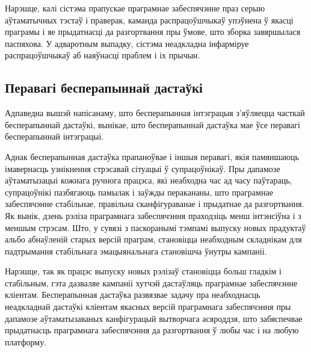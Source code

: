 Нарэшце, калі сістэма прапускае праграмнае забеспячэнне
праз серыю аўтаматычных тэстаў і праверак, каманда распрацоўшчыкаў
упэўнена ў якасці праграмы і яе прыдатнасці да разгортвання
пры ўмове, што зборка завяршылася паспяхова.
У адваротным выпадку, сістэма неадкладна інфарміруе распрацоўшчыкаў
аб наяўнасці праблем і іх прычын.

\subsection{Перавагі бесперапыннай дастаўкі}

Адпаведна вышэй напісанаму, што бесперапынная інтэграцыя з'яўляецца
часткай бесперапыннай дастаўкі, вынікае, што бесперапыннай дастаўка
мае ўсе перавагі бесперапыннай інтэграцыі.

Аднак бесперапынная дастаўка прапаноўвае і іншыя перавагі, якія
памяншаюць іма\-вер\-насць узнікнення стрэсавай сітуацыі ў супрацоўнікаў.
Пры дапамозе аўтаматызацыі кожнага ручнога працэса, які неабходна
час ад часу паўтараць, супрацоўнікі пазбягаюць памылак і заўжды
перакананы, што праграмнае забеспячэнне стабільнае, правільна
сканфігураванае і прыдатнае да разгортвання.
Як вынік, дзень рэліза праграмнага забеспячэння праходзіць менш
інтэнсіўна і з меншым стрэсам.
Што, у сувязі з паскоранымі тэмпамі выпуску новых прадуктаў
альбо абнаўленій старых версій праграм, становіцца неабходным складнікам
для падтрымання стабільнага эмацыянальнага становішча ўнутры кампаніі.

Нарэшце, так як працэс выпуску новых рэлізаў становіцца больш гладкім і
стабільным, гэта дазваляе кампаніі хутчэй дастаўляць
праграмнае забеспячэнне кліентам.
Бесперапынная дастаўка развязвае задачу пра неабходнасць
неадкладнай дастаўкі кліентам якасных версій праграмнага забеспячэння
пры дапамозе аўтаматызаваных канфігурацый вытворчага асяроддзя, што
забяспечвае прыдатнасць праграмнага забеспячэння да разгортвання
ў любы час і на любую платформу.
